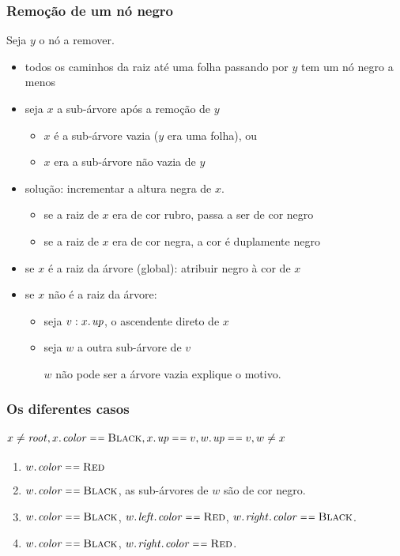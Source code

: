 \documentclass{beamer}
\begin{document}
\begin{frame}
\frametitle{Remoção de um nó negro}

Seja $y$ o nó a remover.
\begin{itemize}
\item todos os caminhos da raiz até uma folha passando por $y$ tem um nó negro a
  menos
\item seja $x$ a sub-árvore após a remoção de $y$ 
  \begin{itemize}
    \item $x$ é a sub-árvore vazia ($y$ era uma folha), ou
    \item $x$ era a sub-árvore não vazia de $y$
  \end{itemize}
\item solução: incrementar a altura negra de $x$.
  \begin{itemize}
  \item se a raiz de $x$ era de cor rubro, passa a ser de cor negro
  \item se a raiz de $x$ era de cor negra, a cor é duplamente negro
  \end{itemize}
\item se $x$ é a raiz da árvore (global): atribuir negro à cor de $x$
\item se $x$ não é a raiz da árvore:
  \begin{itemize}
  \item seja $v : \attrib{x}{up}$, o ascendente direto de $x$
  \item seja $w$ a outra sub-árvore de $v$

    $w$ não pode ser a árvore vazia \pause explique o motivo.
  \end{itemize}
\end{itemize}
\end{frame}

\begin{frame}
\frametitle{Os diferentes casos}
\framesubtitle{$x \neq \id{root}, \attrib{x}{color} \isequal \const{Black}, \attrib{x}{up} \isequal v, \attrib{w}{up} \isequal v, w \neq x$}

\begin{enumerate}
\item $\attrib{w}{color} \isequal \const{Red}$
\item $\attrib{w}{color} \isequal \const{Black}$, as sub-árvores de $w$ são de cor negro.
\item $\attrib{w}{color} \isequal \const{Black}$, 
$\attrib{\attrib{w}{left}}{color} \isequal \const{Red}$, 
$\attrib{\attrib{w}{right}}{color} \isequal \const{Black}$.
\item $\attrib{w}{color} \isequal \const{Black}$, 
$\attrib{\attrib{w}{right}}{color} \isequal \const{Red}$.
\end{enumerate}
\end{frame}
\end{document}
